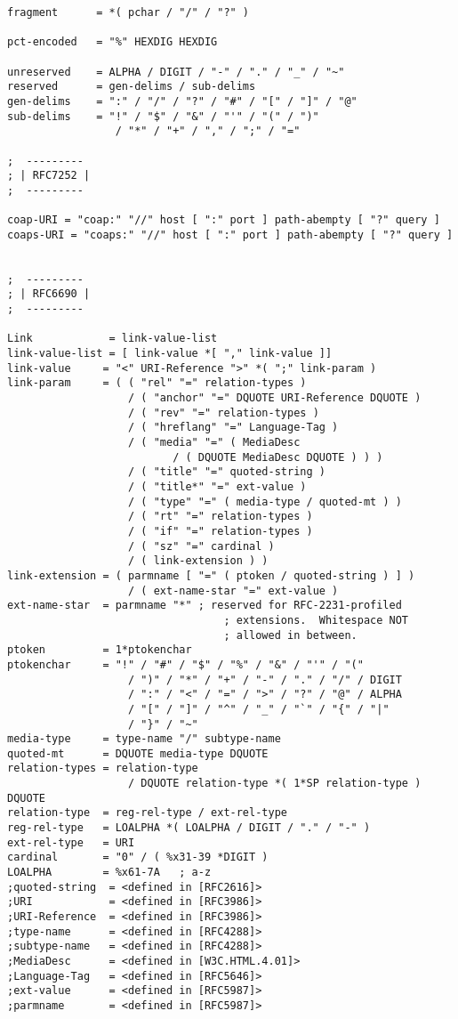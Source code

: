 \begin{verbatim}
fragment      = *( pchar / "/" / "?" )

pct-encoded   = "%" HEXDIG HEXDIG

unreserved    = ALPHA / DIGIT / "-" / "." / "_" / "~"
reserved      = gen-delims / sub-delims
gen-delims    = ":" / "/" / "?" / "#" / "[" / "]" / "@"
sub-delims    = "!" / "$" / "&" / "'" / "(" / ")"
                 / "*" / "+" / "," / ";" / "="

;  ---------
; | RFC7252 |
;  ---------

coap-URI = "coap:" "//" host [ ":" port ] path-abempty [ "?" query ]
coaps-URI = "coaps:" "//" host [ ":" port ] path-abempty [ "?" query ]


;  ---------
; | RFC6690 |
;  ---------

Link            = link-value-list
link-value-list = [ link-value *[ "," link-value ]]
link-value     = "<" URI-Reference ">" *( ";" link-param )
link-param     = ( ( "rel" "=" relation-types )
                   / ( "anchor" "=" DQUOTE URI-Reference DQUOTE )
                   / ( "rev" "=" relation-types )
                   / ( "hreflang" "=" Language-Tag )
                   / ( "media" "=" ( MediaDesc
                          / ( DQUOTE MediaDesc DQUOTE ) ) )
                   / ( "title" "=" quoted-string )
                   / ( "title*" "=" ext-value )
                   / ( "type" "=" ( media-type / quoted-mt ) )
                   / ( "rt" "=" relation-types )
                   / ( "if" "=" relation-types )
                   / ( "sz" "=" cardinal )
                   / ( link-extension ) )
link-extension = ( parmname [ "=" ( ptoken / quoted-string ) ] )
                   / ( ext-name-star "=" ext-value )
ext-name-star  = parmname "*" ; reserved for RFC-2231-profiled
                                  ; extensions.  Whitespace NOT
                                  ; allowed in between.
ptoken         = 1*ptokenchar
ptokenchar     = "!" / "#" / "$" / "%" / "&" / "'" / "("
                   / ")" / "*" / "+" / "-" / "." / "/" / DIGIT
                   / ":" / "<" / "=" / ">" / "?" / "@" / ALPHA
                   / "[" / "]" / "^" / "_" / "`" / "{" / "|"
                   / "}" / "~"
media-type     = type-name "/" subtype-name
quoted-mt      = DQUOTE media-type DQUOTE
relation-types = relation-type
                   / DQUOTE relation-type *( 1*SP relation-type ) DQUOTE
relation-type  = reg-rel-type / ext-rel-type
reg-rel-type   = LOALPHA *( LOALPHA / DIGIT / "." / "-" )
ext-rel-type   = URI
cardinal       = "0" / ( %x31-39 *DIGIT )
LOALPHA        = %x61-7A   ; a-z
;quoted-string  = <defined in [RFC2616]>
;URI            = <defined in [RFC3986]>
;URI-Reference  = <defined in [RFC3986]>
;type-name      = <defined in [RFC4288]>
;subtype-name   = <defined in [RFC4288]>
;MediaDesc      = <defined in [W3C.HTML.4.01]>
;Language-Tag   = <defined in [RFC5646]>
;ext-value      = <defined in [RFC5987]>
;parmname       = <defined in [RFC5987]>



\end{verbatim}
